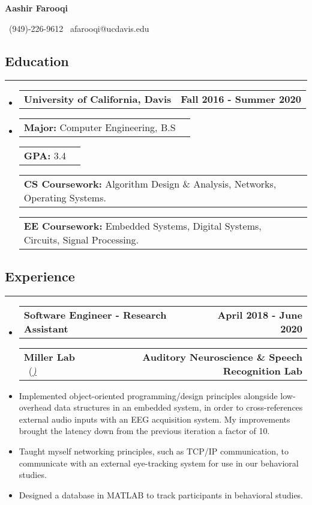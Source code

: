\documentclass[10pt,letterpaper]{article}
\makeatletter
\newcommand{\items}[2]
{
	\begin{tabular*}{\linewidth}{l @{\extracolsep{\fill}} r}
		#1 & #2 \\
	\end{tabular*}
}
\newcommand{\header}[2]
{
	\begin{tabular*}{\linewidth}{l @{\extracolsep{\fill}} r}
		\hspace{-27pt} #1 & #2 \\
	\end{tabular*}
}
\newcommand{\sectionbreak}
{
	\vspace{-1.2em}
	\rule{\textwidth}{1.7pt}
	\vspace{-1.7em}
}
\makeatother
\begin{document}
\begin{center}
	{\LARGE \textbf{Aashir Farooqi}}

	\vspace{0.5em}
	\ (949)-226-9612 \textbar 
	\ afarooqi@ucdavis.edu\textbar
	\ \href{https://github.com/AashPointO}{\emph{\underline{}}}
	\\
\end{center}
\vspace{-20pt}


\subsection*{Education}
\sectionbreak

\begin{itemize}

	\item[] 
		\header
		{\textbf{University of California, Davis}}
		{\textbf{Fall 2016 - Summer 2020}}
	\item[]
		\vspace{-2.5pt}
	\items
		{\textbf{Major:} Computer Engineering, B.S}
		{}
	\items
		{\textbf{GPA:} 3.4}
		{}
	\items
		{\textbf{CS Coursework:} Algorithm Design \& Analysis, Networks, Operating Systems.}
		{}
	\items
		{\textbf{EE Coursework:} Embedded Systems, Digital Systems, Circuits, Signal Processing.}
		{}
		{\vspace{-0.6em}}

\end{itemize}

\vspace{-24.65pt}

\subsection*{Experience}
\sectionbreak

\begin{itemize}
	\item[]
		\header
		{\textbf{Software Engineer - Research Assistant}} 
		{\textbf{April 2018 - June 2020}}
		\header
		{\textbf{Miller Lab} \ (\href{https://millerlab.faculty.ucdavis.edu}{\small \emph{\underline{\smash{millerlab.faculty.ucdavis.edu})}}} }
		{\textbf{Auditory Neuroscience \& Speech Recognition Lab}} 
	\item
		Implemented object-oriented programming/design principles alongside low-overhead data structures in an embedded system, in order to cross-references external audio inputs with an EEG acquisition system. My improvements brought the latency down from the previous iteration a factor of 10.
	\item 
		Taught myself networking principles, such as TCP/IP communication, to communicate with an external eye-tracking system for use in our behavioral studies. 
	\item 
		Designed a database in MATLAB to track participants in behavioral studies.
		

\end{itemize}
\end{document}
